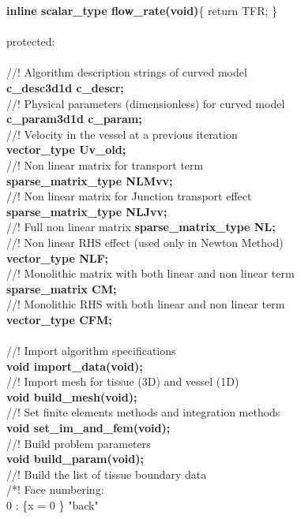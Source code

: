 \documentclass[a4paper]{report}
\newcommand\tab[1][1cm]{\hspace*{#1}}
\begin{document}
{\textbf{inline scalar\_\-type flow\_\-rate(void)}\{ return TFR; \}\\ \\
protected:\\ \\
//! Algorithm description strings of curved model\\
\textbf{c\_\-desc3d1d c\_\-descr;}\\
//! Physical parameters (dimensionless) for curved model\\
\textbf{c\_\-param3d1d c\_\-param;}\\
//! Velocity in the vessel at a previous iteration\\
\textbf{vector\_\-type Uv\_\-old;}\\
//! Non linear matrix for transport term\\
\textbf{sparse\_\-matrix\_\-type NLMvv;}\\
//! Non linear matrix for Junction transport effect\\
\textbf{sparse\_\-matrix\_\-type NLJvv;}\\
//! Full non linear matrix
\textbf{sparse\_\-matrix\_\-type NL;}\\
//! Non linear RHS effect (used only in Newton Method)\\
\textbf{vector\_\-type NLF;}\\
//! Monolithic matrix with both linear and non linear term\\
\textbf{sparse\_\-matrix CM;}\\
//! Monolithic RHS with both linear and non linear term\\
\textbf{vector\_\-type CFM;}\\ \\
//! Import algorithm specifications\\
\textbf{void import\_\-data(void);}\\
//! Import mesh for tissue (3D) and vessel (1D)\\
\textbf{void build\_\-mesh(void);}\\
//! Set finite elements methods and integration methods\\
\textbf{void set\_\-im\_\-and\_\-fem(void);}\\
//! Build problem parameters\\
\textbf{void build\_\-param(void);}\\
//! Build the list of tissue boundary data\\
	/*!	Face numbering:\\
	\tab 0 : \{x = 0 \}  "back"\\
}
\end{document}

